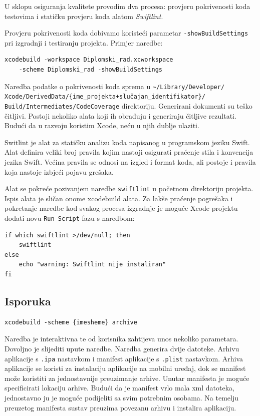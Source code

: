 \documentclass[times, utf8, diplomski, numeric]{fer}
\begin{document}
\begin{appendices}
U sklopu osiguranja kvalitete provodim dva procesa: provjeru pokrivenosti koda testovima i statičku provjeru koda alatom \textit{Swiftlint}.

Provjeru pokrivenosti koda dobivamo koristeći parametar \verb|-showBuildSettings| pri izgradnji i testiranju projekta. Primjer naredbe:

\begin{verbatim}
xcodebuild -workspace Diplomski_rad.xcworkspace
    -scheme Diplomski_rad -showBuildSettings
\end{verbatim}

Naredba podatke o pokrivenosti koda sprema u \verb|~/Library/Developer/|\\\verb|Xcode/DerivedData/{ime_projekta+slučajan_identifikator}/|\\\verb|Build/Intermediates/CodeCoverage| direktoriju. Generirani dokumenti su teško čitljivi. Postoji nekoliko alata koji ih obrađuju i generiraju čitljive rezultati. Budući da u razvoju koristim Xcode, neću u njih dublje ulaziti.

Switlint je alat za statičku analizu koda napisanog u programskom jeziku Swift. Alat definira veliki broj pravila kojim nastoji osigurati praćenje stila i konvencija jezika Swift. Većina pravila se odnosi na izgled i format koda, ali postoje i pravila koja nastoje izbjeći pojavu grešaka.

Alat se pokreće pozivanjem naredbe \verb|swiftlint| u početnom direktoriju projekta. Ispis alata je sličan onome xcodebuild alata. Za lakše praćenje pogrešaka i pokretanje naredbe kod svakog procesa izgradnje je moguće Xcode projektu dodati novu \verb|Run Script| fazu s naredbom:

\begin{verbatim}
if which swiftlint >/dev/null; then
    swiftlint
else
    echo "warning: Swiftlint nije instaliran"
fi
\end{verbatim}

\subsection{Isporuka}

\begin{verbatim}
xcodebuild -scheme {imesheme} archive
\end{verbatim}

Naredba je interaktivna te od korisnika zahtijeva unos nekoliko parametara. Dovoljno je slijediti upute naredbe. Naredba generira dvije datoteke. Arhivu aplikacije s \verb|.ipa| nastavkom i manifest aplikacije s \verb|.plist| nastavkom. Arhiva aplikacije se koristi za instalaciju aplikacije na mobilni uređaj, dok se manifest može koristiti za jednostavnije preuzimanje arhive. Unutar manifesta je moguće specificirati lokaciju arhive. Budući da je manifest vrlo mala xml datoteka, jednostavno ju je moguće podijeliti sa svim potrebnim osobama. Na temelju preuzetog manifesta sustav preuzima povezanu arhivu i instalira aplikaciju.




\end{appendices}
\end{document}
